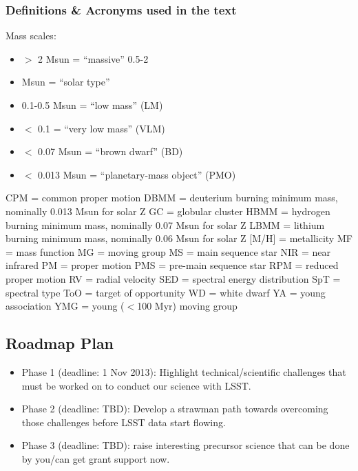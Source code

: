\subsubsection{Definitions \& Acronyms used in the text}
Mass scales: 
\begin{itemize}
\item{$>$ 
2 Msun = “massive” }
0.5-2 
\item{
Msun = “solar type” }
\item{0.1-0.5 
Msun = “low mass” (LM) }
\item{$<$ 
0.1 = “very low mass” (VLM) }
\item{$<$ 
0.07 Msun = “brown dwarf” (BD) }
\item{$<$ 
0.013 Msun = “planetary-mass object” (PMO) }
\end{itemize}


CPM = common proper motion  DBMM = deuterium burning minimum mass, nominally 0.013 Msun for solar Z  GC = globular cluster  HBMM = hydrogen burning minimum mass, nominally 0.07 Msun for solar Z  LBMM = lithium burning minimum mass, nominally 0.06 Msun for solar Z 
[M/H] = metallicity 
MF = mass function  MG = moving group  MS = main sequence star  NIR = near infrared  PM = proper motion  PMS = pre-main sequence star  RPM = reduced proper motion  RV = radial velocity 
 SED = spectral energy distribution  SpT = spectral type  ToO = target of opportunity  WD = white dwarf  YA = young association  YMG = young ($<$100 Myr) moving group 

\subsection{Roadmap Plan }
\begin{itemize}
\item{Phase 
1 (deadline: 1 Nov 2013): Highlight technical/scientific challenges that must be  worked on to conduct our science with LSST. }
\item{Phase 
2 (deadline: TBD): Develop a strawman path towards overcoming those  challenges before LSST data start flowing. }
\item{ Phase 
3 (deadline: TBD): raise interesting precursor science that can be done by  you/can get grant support now. }
\end{itemize}


